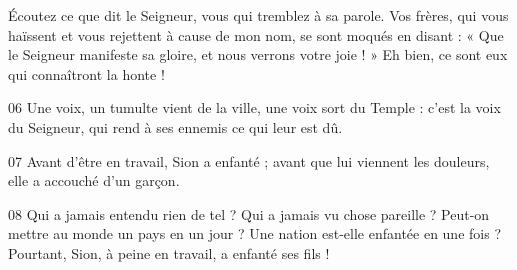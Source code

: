 Écoutez ce que dit le Seigneur, vous qui tremblez à sa parole. Vos frères, qui vous haïssent et vous rejettent à cause de mon nom, se sont moqués en disant : « Que le Seigneur manifeste sa gloire, et nous verrons votre joie ! » Eh bien, ce sont eux qui connaîtront la honte !

06 Une voix, un tumulte vient de la ville, une voix sort du Temple : c’est la voix du Seigneur, qui rend à ses ennemis ce qui leur est dû.

07 Avant d’être en travail, Sion a enfanté ; avant que lui viennent les douleurs, elle a accouché d’un garçon.

08 Qui a jamais entendu rien de tel ? Qui a jamais vu chose pareille ? Peut-on mettre au monde un pays en un jour ? Une nation est-elle enfantée en une fois ? Pourtant, Sion, à peine en travail, a enfanté ses fils !
